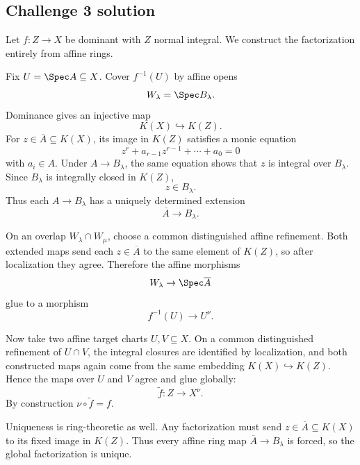 \subsection*{Challenge 3 solution}
\begin{solution}
Let \(f:Z\to X\) be dominant with \(Z\) normal integral. We construct the factorization entirely from affine
rings.

Fix \(U=\Spec A\subseteq X\). Cover \(f^{-1}(U)\) by affine opens
\[
W_\lambda=\Spec B_\lambda.
\]
Dominance gives an injective map
\[
K(X)\hookrightarrow K(Z).
\]
For \(z\in\overline A\subseteq K(X)\), its image in \(K(Z)\) satisfies a monic equation
\[
z^r+a_{r-1}z^{r-1}+\cdots+a_0=0
\]
with \(a_i\in A\). Under \(A\to B_\lambda\), the same equation shows that \(z\) is integral over
\(B_\lambda\). Since \(B_\lambda\) is integrally closed in \(K(Z)\),
\[
z\in B_\lambda.
\]
Thus each \(A\to B_\lambda\) has a uniquely determined extension
\[
\overline A\to B_\lambda.
\]

On an overlap \(W_\lambda\cap W_\mu\), choose a common distinguished affine refinement. Both extended maps send
each \(z\in\overline A\) to the same element of \(K(Z)\), so after localization they agree. Therefore the affine
morphisms
\[
W_\lambda\to\Spec\overline A
\]
glue to a morphism
\[
f^{-1}(U)\to U^\nu.
\]

Now take two affine target charts \(U,V\subseteq X\). On a common distinguished refinement of \(U\cap V\), the
integral closures are identified by localization, and both constructed maps again come from the same embedding
\(K(X)\hookrightarrow K(Z)\). Hence the maps over \(U\) and \(V\) agree and glue globally:
\[
\widetilde f:Z\to X^\nu.
\]
By construction \(\nu\circ\widetilde f=f\).

Uniqueness is ring-theoretic as well. Any factorization must send \(z\in\overline A\subseteq K(X)\) to its fixed
image in \(K(Z)\). Thus every affine ring map \(\overline A\to B_\lambda\) is forced, so the global factorization
is unique.
\end{solution}

